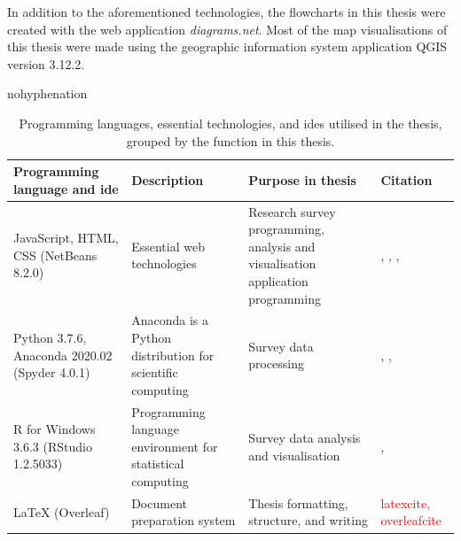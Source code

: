 In addition to the aforementioned technologies, the flowcharts in this thesis were created with the web application \textit{diagrams.net}. Most of the map visualisations of this thesis were made using the geographic information system application QGIS version 3.12.2.

\begin{hyphenrules}{nohyphenation}
    \begin{table}[H]
        \centering
        \caption[Thesis programming languages]{Programming languages, essential technologies, and \glspl{ide} utilised in the thesis, grouped by the function in this thesis.} 
        \label{tab:used_langs}
        \def\arraystretch{1.4}
        \setlength\tabcolsep{1.2ex}
        \begin{tabular}{ @{} >{\raggedright\arraybackslash}p{3cm} >{\raggedright\arraybackslash}p{4.5cm} >{\raggedright\arraybackslash}p{3.5cm} >{\raggedleft\arraybackslash}p{3.5cm} @{} }
            \toprule
            Programming language and \gls{ide} & Description & Purpose in thesis & Citation \\
            \midrule
            JavaScript, HTML, CSS (NetBeans 8.2.0) & Essential web technologies & Research survey programming, analysis and visualisation application programming & \cite{WHATWG2020}, \cite{W3C2020}, \cite{ECMA2019}, \cite{ApacheSoftwareFoundation2016} \\
            Python 3.7.6, Anaconda 2020.02 (Spyder 4.0.1) & Anaconda is a Python distribution for scientific computing & Survey data processing & \cite{Python3Reference}, \cite{AnacondaInc.2020}, \cite{SpyderProjectContributors2020} \\
            R for Windows 3.6.3 (RStudio 1.2.5033) & Programming language environment for statistical computing & Survey data analysis and visualisation & \cite{RCoreTeam2020}, \cite{RStudioTeam2015} \\
            LaTeX (Overleaf) & Document preparation system & Thesis formatting, structure, and writing & \textcolor{red}{latexcite, overleafcite} \\
            \bottomrule
        \end{tabular}
    \end{table} 
\end{hyphenrules}

